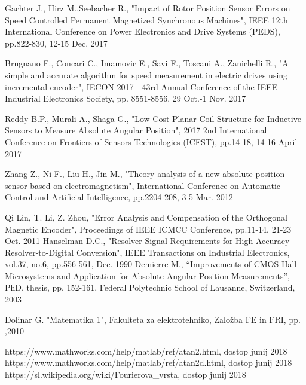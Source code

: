 \documentclass[a4paper]{article}
\begin{document}
\small
\begin{thebibliography}{1}
 Gachter J., Hirz M.,Seebacher R., "Impact of Rotor Position Sensor Errors on Speed
Controlled Permanent Magnetized Synchronous
Machines", IEEE 12th International Conference on Power Electronics and Drive Systems (PEDS), pp.822-830, 12-15 Dec. 2017

 Brugnano F., Concari C., Imamovic E., Savi F., Toscani  A., Zanichelli R., "A simple and accurate algorithm for speed measurement in electric drives using incremental encoder",
IECON 2017 - 43rd Annual Conference of the IEEE Industrial Electronics Society, pp. 8551-8556, 29 Oct.-1 Nov. 2017


 Reddy B.P., Murali A., Shaga G., "Low Cost Planar Coil Structure for Inductive Sensors to Measure Absolute Angular
Position", 2017 2nd International Conference on Frontiers of Sensors Technologies (ICFST), pp.14-18, 14-16 April 2017




 Zhang Z., Ni F., Liu H., Jin M., "Theory analysis of a new absolute position sensor based on electromagnetism", International Conference on Automatic Control and Artificial Intelligence, pp.2204-208, 3-5 Mar. 2012

	
	
 Qi Lin, T. Li, Z. Zhou, "Error Analysis and Compensation
of the Orthogonal Magnetic Encoder", Proceedings of IEEE ICMCC
Conference, pp.11-14, 21-23 Oct. 2011
 Hanselman D.C., "Resolver Signal Requirements for High Accuracy
Resolver-to-Digital Conversion", IEEE Transactions on Industrial
Electronics, vol.37, no.6, pp.556-561, Dec. 1990 
 Demierre M., “Improvements of CMOS Hall Microsystems and
Application for Absolute Angular Position Measurements”, PhD. thesis,
pp. 152-161, Federal Polytechnic School of Lausanne, Switzerland, 2003

 Dolinar G. "Matematika 1", Fakulteta za elektrotehniko, Založba FE in FRI, pp. ,2010

 https://www.mathworks.com/help/matlab/ref/atan2.html, dostop junij 2018
 https://www.mathworks.com/help/matlab/ref/atan2d.html, dostop junij 2018
 https://sl.wikipedia.org/wiki/Fourierova\_vrsta, dostop junij 2018


\end{thebibliography}
\end{document}
